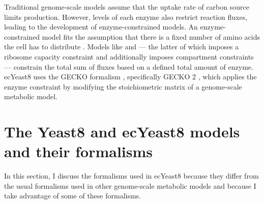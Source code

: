 Traditional genome-scale models assume that the uptake rate of carbon source limits production.
However, levels of each enzyme also restrict reaction fluxes, leading to the development of enzyme-constrained models.
An enzyme-constrained model fits the assumption that there is a fixed number of amino acids the cell has to distribute \parencite{weisseMechanisticLinksCellular2015}.
Models like \textcite{sanchezImprovingPhenotypePredictions2017} and \textcite{elsemmanWholecellModelingYeast2022} --- the latter of which imposes a ribosome capacity constraint and additionally imposes compartment constraints --- constrain the total sum of fluxes based on a defined total amount of enzyme.
ecYeast8 uses the GECKO formalism \parencite{sanchezImprovingPhenotypePredictions2017}, specifically GECKO 2 \parencite{domenzainReconstructionCatalogueGenomescale2022}, which applies the enzyme constraint by modifying the stoichiometric matrix of a genome-scale metabolic model.

\section{The Yeast8 and ecYeast8 models and their formalisms}
\label{sec:model-yeast8}

In this section, I discuss the formalisms used in ecYeast8 because they differ from the usual formalisms used in other genome-scale metabolic models and because I take advantage of some of these formalisms.

